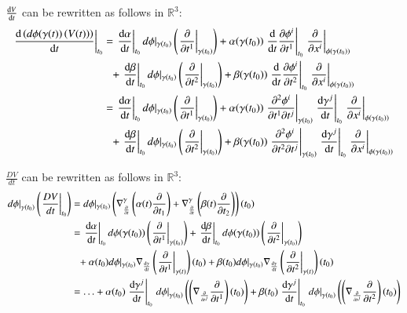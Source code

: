 \documentclass[a4paper, 12pt]{article}
\theoremstyle{Mydefinition}
\theoremstyle{Mytheorem}
\begin{document}
$\dv{V}{t}$ can be rewritten as follows in $\mathbb{R}^3$:
\begin{equation*}
\begin{split}
    \left.\dv{\left(d\phi(\gamma(t))\left(V(t)\right)\right)}{t}\right|_{t_0} &= \left.\dv{\alpha}{t}\right|_{t_0}d\phi|_{\gamma(t_0)}\left(\left.\pdv{t^1}\right|_{\gamma(t_0)}\right) + \alpha(\gamma(t_0)) \left.\dv{t}\pdv{\phi^i}{t^1}(\gamma(t))\right|_{t_0}\left.\pdv{x^i}\right|_{\phi(\gamma(t_0))}\\
    &\phantom{=}+\left.\dv{\beta}{t}\right|_{t_0}d\phi|_{\gamma(t_0)}\left(\left.\pdv{t^2}\right|_{\gamma(t_0)}\right) + \beta(\gamma(t_0)) \left.\dv{t}\pdv{\phi^i}{t^2}(\gamma(t))\right|_{t_0}\left.\pdv{x^i}\right|_{\phi(\gamma(t_0))}\\
    &=\left.\dv{\alpha}{t}\right|_{t_0}d\phi|_{\gamma(t_0)}\left(\left.\pdv{t^1}\right|_{\gamma(t_0)}\right) + \alpha(\gamma(t_0)) \left.\frac{\partial^2\phi^i}{\partial t^1 \partial t^j}\right|_{\gamma(t_0)}\left.\dv{\gamma^j}{t}\right|_{t_0}\left.\pdv{x^i}\right|_{\phi(\gamma(t_0))}\\
    &\phantom{=}+\left.\dv{\beta}{t}\right|_{t_0}d\phi|_{\gamma(t_0)}\left(\left.\pdv{t^2}\right|_{\gamma(t_0)}\right) + \beta(\gamma(t_0)) \left.\frac{\partial^2\phi^i}{\partial t^2 \partial t^j}\right|_{\gamma(t_0)}\left.\dv{\gamma^j}{t}\right|_{t_0}\left.\pdv{x^i}\right|_{\phi(\gamma(t_0))}
\end{split}
\end{equation*}

$\frac{DV}{dt}$ can be rewritten as follows in $\mathbb{R}^3$:
\begin{equation*}
\begin{split}
    \left.d\phi\right|_{\gamma(t_0)}\left(\left.\frac{DV}{dt}\right|_{t_0}\right) &= d\phi|_{\gamma(t_0)}\left(\nabla^\gamma_{\pdv{t}}  \left(\alpha(t)\pdv{t_1}\right) + \nabla^\gamma_{\pdv{t}}\left(\beta(t)\pdv{t_2}\right)\right)(t_0)\\
    &=\left.\dv{\alpha}{t}\right|_{t_0}d\phi(\gamma(t_0))\left(\left.\pdv{t^1}\right|_{\gamma(t_0)}\right) + \left.\dv{\beta}{t}\right|_{t_0}d\phi(\gamma(t_0))\left(\left.\pdv{t^2}\right|_{\gamma(t_0)}\right)\\
    &\phantom{=}+\alpha(t_0)d\phi|_{\gamma(t_0)}\nabla_{\dv{\gamma}{t}}\left(\left.\pdv{t^1}\right|_{\gamma(t)}\right)(t_0)+\beta(t_0)d\phi|_{\gamma(t_0)}\nabla_{\dv{\gamma}{t}}\left(\left.\pdv{t^2}\right|_{\gamma(t)}\right)(t_0)\\
    &=\ldots + \alpha(t_0) \left.\dv{\gamma^j}{t}\right|_{t_0}\left.d\phi\right|_{\gamma(t_0)} \left( \left(\nabla_{\pdv{t^j}}\pdv{t^1}\right)(t_0)\right) + \beta(t_0) \left.\dv{\gamma^j}{t}\right|_{t_0}\left.d\phi\right|_{\gamma(t_0)} \left( \left(\nabla_{\pdv{t^j}}\pdv{t^2}\right)(t_0)\right)
\end{split}
\end{equation*}
\end{document}
